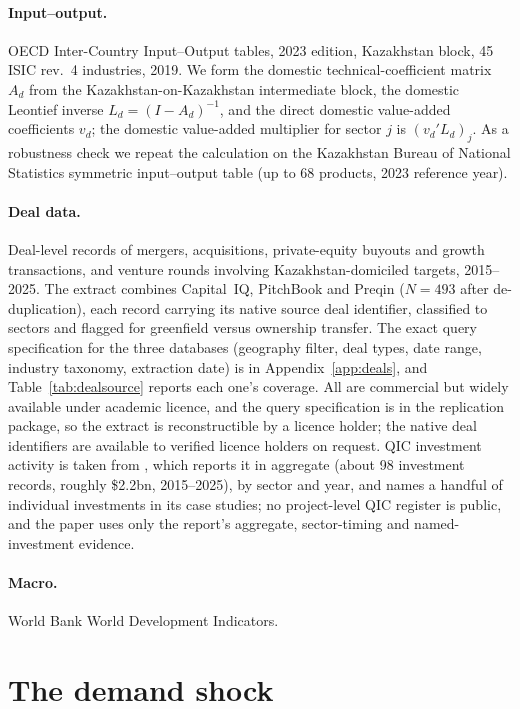 \documentclass[12pt]{article}
\begin{document}
\paragraph{Input--output.} OECD Inter-Country Input--Output tables, 2023 edition, Kazakhstan
block, 45 ISIC rev.~4 industries, 2019. We form the domestic technical-coefficient matrix
$A_d$ from the Kazakhstan-on-Kazakhstan intermediate block, the domestic Leontief inverse
$L_d = (I-A_d)^{-1}$, and the direct domestic value-added coefficients $v_d$; the domestic
value-added multiplier for sector $j$ is $(v_d' L_d)_j$. As a robustness check we repeat the
calculation on the Kazakhstan Bureau of National Statistics symmetric input--output table (up
to 68 products, 2023 reference year).

\paragraph{Deal data.} Deal-level records of mergers, acquisitions, private-equity buyouts and
growth transactions, and venture rounds involving Kazakhstan-domiciled targets, 2015--2025.
The extract combines Capital~IQ, PitchBook and Preqin ($N = 493$ after de-duplication), each record carrying its native source deal identifier, classified to
sectors and flagged for greenfield versus ownership transfer.
The exact query specification for the three databases (geography filter, deal types, date
range, industry taxonomy, extraction date) is in Appendix~\ref{app:deals}, and
Table~\ref{tab:dealsource} reports each one's coverage. All are commercial but widely
available under academic licence, and the query specification is in the replication package, so the extract is reconstructible by a licence holder; the native deal identifiers are available to verified licence holders on request. QIC investment activity is
taken from \citet{qicaifcifc2026pe}, which reports it in aggregate (about 98 investment
records, roughly \$2.2bn, 2015--2025), by sector and year, and names a handful of individual
investments in its case studies; no project-level QIC register is public, and the paper uses
only the report's aggregate, sector-timing and named-investment evidence.

\paragraph{Macro.} World Bank World Development Indicators.

\section{The demand shock}\label{sec:shock}
\end{document}
